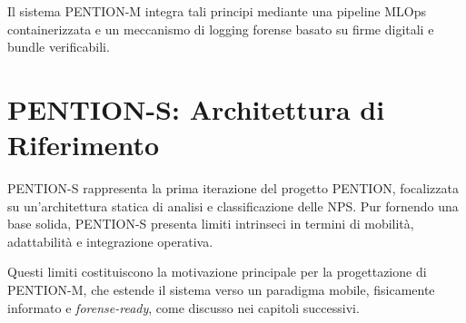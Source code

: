 Il sistema PENTION-M integra tali principi mediante una pipeline MLOps containerizzata e un meccanismo di logging forense basato su firme digitali e bundle verificabili.

\section{PENTION-S: Architettura di Riferimento}
\label{sec:pention_s}

PENTION-S rappresenta la prima iterazione del progetto PENTION, focalizzata su un’architettura statica di analisi e classificazione delle NPS.
Pur fornendo una base solida, PENTION-S presenta limiti intrinseci in termini di mobilità, adattabilità e integrazione operativa.

Questi limiti costituiscono la motivazione principale per la progettazione di PENTION-M, che estende il sistema verso un paradigma mobile, fisicamente informato e \textit{forense-ready}, come discusso nei capitoli successivi.